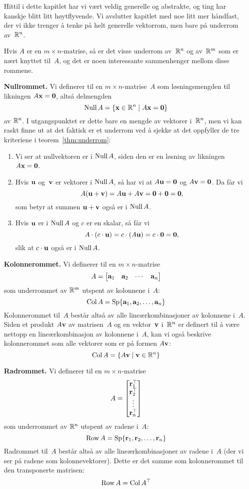 Hittil i dette kapitlet har vi vært veldig generelle og abstrakte, og
ting har kanskje blitt litt høytflyvende.  Vi avslutter kapitlet med
noe litt mer håndfast, der vi ikke trenger å tenke på helt generelle
vektorrom, men bare på underrom av~$\mathbb{R}^n$.

Hvis $A$ er en $m \times n$-matrise, så er det visse underrom
av~$\mathbb{R}^n$ og av~$\mathbb{R}^m$ som er nært knyttet til~$A$, og det er noen
interessante sammenhenger mellom disse rommene.

\medskip\noindent\textbf{Nullrommet. }%
Vi definerer  til en $m \times n$-matrise~$A$ som
løsningsmengden til likningen $A \mathbf{x} = \mathbf{0}$, altså delmengden
\[
\operatorname{Null} A = \{ \mathbf{x} \in \mathbb{R}^n \mid A \mathbf{x} = \mathbf{0} \}
\]
av $\mathbb{R}^n$.  I utgangspunktet er dette bare en mengde av vektorer
i~$\mathbb{R}^n$, men vi kan raskt finne ut at det faktisk er et underrom ved
å sjekke at det oppfyller de tre kriteriene i teorem~\ref{thm:underrom}:
\begin{enumerate}
\item Vi ser at nullvektoren er i $\operatorname{Null} A$, siden den er en løsning
av likningen $A \mathbf{x} = \mathbf{0}$.
\item Hvis $\mathbf{u}$ og~$\mathbf{v}$ er vektorer i $\operatorname{Null} A$, så har vi at
$A \mathbf{u} = \mathbf{0}$ og $A \mathbf{v} = \mathbf{0}$.  Da får vi
\[
A (\mathbf{u} + \mathbf{v}) = A \mathbf{u} + A \mathbf{v} = \mathbf{0} + \mathbf{0} = \mathbf{0},
\]
som betyr at summen $\mathbf{u} + \mathbf{v}$ også er i $\operatorname{Null} A$.
\item Hvis $\mathbf{u}$ er i $\operatorname{Null} A$ og $c$ er en skalar, så får vi
\[
A \cdot (c \cdot \mathbf{u}) = c \cdot (A \mathbf{u}) = c \cdot \mathbf{0} = \mathbf{0},
\]
slik at $c \cdot \mathbf{u}$ også er i $\operatorname{Null} A$.
\end{enumerate}

\medskip\noindent\textbf{Kolonnerommet. }%
Vi definerer  til en $m \times n$-matrise
\[
A = \begin{bmatrix} \mathbf{a}_1 & \mathbf{a}_2 & \cdots & \mathbf{a}_n \end{bmatrix}
\]
som underrommet av $\mathbb{R}^m$ utspent av kolonnene i~$A$:
\[
\operatorname{Col} A = \operatorname{Sp} \{ \mathbf{a}_1, \mathbf{a}_2, \ldots, \mathbf{a}_n \}
\]
Kolonnerommet til~$A$ består altså av alle lineærkombinasjoner av
kolonnene i~$A$.  Siden et produkt $A \mathbf{v}$ av matrisen~$A$ og en
vektor~$\mathbf{v}$ i~$\mathbb{R}^n$ er definert til å være nettopp en
lineærkombinasjon av kolonnene i~$A$, kan vi også beskrive
kolonnerommet som alle vektorer som er på formen $A \mathbf{v}$:
\[
\operatorname{Col} A = \{ A \mathbf{v} \mid \mathbf{v} \in \mathbb{R}^n \}
\]

\medskip\noindent\textbf{Radrommet. }%
Vi definerer  til en $m \times n$-matrise
\[
A = \begin{bmatrix} \mathbf{r}_1^\top \\ \mathbf{r}_2^\top \\ \vdots \\ \mathbf{r}_n^\top \end{bmatrix}
\]
som underrommet av $\mathbb{R}^n$ utspent av radene i~$A$:
\[
\operatorname{Row} A = \operatorname{Sp} \{ \mathbf{r}_1, \mathbf{r}_2, \ldots, \mathbf{r}_n \}
\]
Radrommet til~$A$ består altså av alle lineærkombinasjoner av radene
i~$A$ (der vi ser på radene som kolonnevektorer).  Dette er det samme
som kolonnerommet til den transponerte matrisen:
\[
\operatorname{Row} A = \operatorname{Col} A^\top
\]

